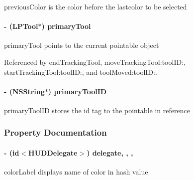 previous\-Color is the color before the lastcolor to be selected \hypertarget{interface_h_u_d_layer_aad9b0e2b4164986e18ea0a9afcd1a914}{
\paragraph[{primary\-Tool}]{\setlength{\rightskip}{0pt plus 5cm}-\/ ({\bf L\-P\-Tool}$\ast$) primary\-Tool\hspace{0.3cm}{\ttfamily [protected]}}}\label{d3/d8a/interface_h_u_d_layer_aad9b0e2b4164986e18ea0a9afcd1a914}
primary\-Tool points to the current pointable object 

Referenced by end\-Tracking\-Tool, move\-Tracking\-Tool\-:tool\-I\-D\-:, start\-Tracking\-Tool\-:tool\-I\-D\-:, and tool\-Moved\-:tool\-I\-D\-:.

\hypertarget{interface_h_u_d_layer_aae17304a5ecff2a6fa43471edb779341}{
\paragraph[{primary\-Tool\-I\-D}]{\setlength{\rightskip}{0pt plus 5cm}-\/ (N\-S\-String$\ast$) primary\-Tool\-I\-D\hspace{0.3cm}{\ttfamily [protected]}}}\label{d3/d8a/interface_h_u_d_layer_aae17304a5ecff2a6fa43471edb779341}
primary\-Tool\-I\-D stores the id tag to the pointable in reference 

\subsubsection{Property Documentation}
\hypertarget{interface_h_u_d_layer_a64cb26c1f8c5a76e8f392a02291c0cf6}{
\paragraph[{delegate}]{\setlength{\rightskip}{0pt plus 5cm}-\/ (id$<${\bf H\-U\-D\-Delegate}$>$) delegate\hspace{0.3cm}{\ttfamily [read]}, {\ttfamily [write]}, {\ttfamily [nonatomic]}, {\ttfamily [weak]}}}\label{d3/d8a/interface_h_u_d_layer_a64cb26c1f8c5a76e8f392a02291c0cf6}
color\-Label displays name of color in hash value 

